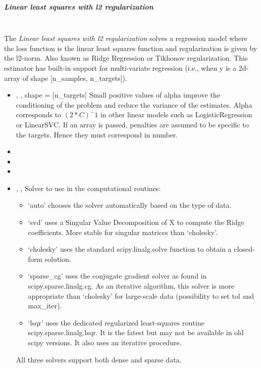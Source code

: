 \subparagraph{Linear least squares with l2 regularization}
\mbox{}
\\The \textit{Linear least squares with l2 regularization} solves a regression
model where the loss function is the linear least squares function and
regularization is given by the l2-norm.
%
Also known as Ridge Regression or Tikhonov regularization.
%
This estimator has built-in support for multi-variate regression (i.e., when y
is a 2d-array of shape [n\_samples, n\_targets]).
%
\begin{itemize}
  \item {} , ,
  shape = [n\_targets] Small positive values of alpha improve the
  conditioning of the problem and reduce the variance of the estimates.
  Alpha corresponds to $(2*C)^-1$ in other linear models such as
  LogisticRegression or LinearSVC.
  If an array is passed, penalties are assumed to be specific to the targets.
  Hence they must correspond in number.
  \item {}
  \item {}
  \item {}
  \item {} , ,
  Solver to use in the computational routines:
				\begin{itemize}
    				\item‘auto’ chooses the solver automatically based on the type of
    data.
    				\item‘svd’ uses a Singular Value Decomposition of X to compute the
    Ridge coefficients.
    More stable for singular matrices than ‘cholesky’.
    				\item‘cholesky’ uses the standard scipy.linalg.solve function to
    obtain a closed-form solution.
    				\item‘sparse\_cg’ uses the conjugate gradient solver
    as found in scipy.sparse.linalg.cg.
    As an iterative algorithm, this solver is more appropriate than
    ‘cholesky’ for large-scale data (possibility to set tol and
    max\_iter).
    				\item‘lsqr’ uses the dedicated regularized least-squares routine
    scipy.sparse.linalg.lsqr.
    It is the fatest but may not be available in old scipy versions.
    It also uses an iterative procedure.
				\end{itemize}
  				All three solvers support both dense and sparse data.
\end{itemize}

